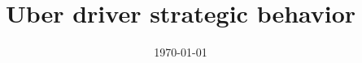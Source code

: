 \documentclass[11pt]{article}
\title{Uber driver strategic behavior}
\date{\today}
\begin{document}
\maketitle	



\onehalfspacing




\end{document}
